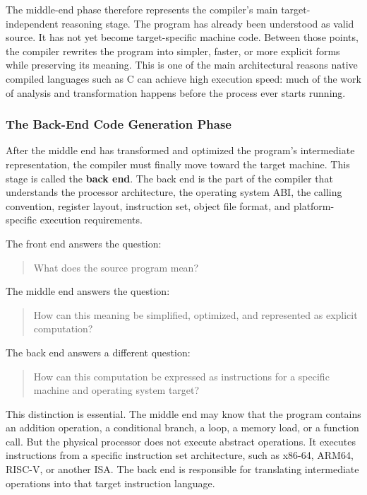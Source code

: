 The middle-end phase therefore represents the compiler's main target-independent reasoning stage. The program has already been understood as valid source. It has not yet become target-specific machine code. Between those points, the compiler rewrites the program into simpler, faster, or more explicit forms while preserving its meaning. This is one of the main architectural reasons native compiled languages such as C can achieve high execution speed: much of the work of analysis and transformation happens before the process ever starts running.




\subsubsection{The Back-End Code Generation Phase}

After the middle end has transformed and optimized the program's intermediate representation, the compiler must finally move toward the target machine. This stage is called the \textbf{back end}. The back end is the part of the compiler that understands the processor architecture, the operating system ABI, the calling convention, register layout, instruction set, object file format, and platform-specific execution requirements.

The front end answers the question:

\begin{quote}
What does the source program mean?
\end{quote}

The middle end answers the question:

\begin{quote}
How can this meaning be simplified, optimized, and represented as explicit computation?
\end{quote}

The back end answers a different question:

\begin{quote}
How can this computation be expressed as instructions for a specific machine and operating system target?
\end{quote}

This distinction is essential. The middle end may know that the program contains an addition operation, a conditional branch, a loop, a memory load, or a function call. But the physical processor does not execute abstract operations. It executes instructions from a specific instruction set architecture, such as x86-64, ARM64, RISC-V, or another ISA. The back end is responsible for translating intermediate operations into that target instruction language.

